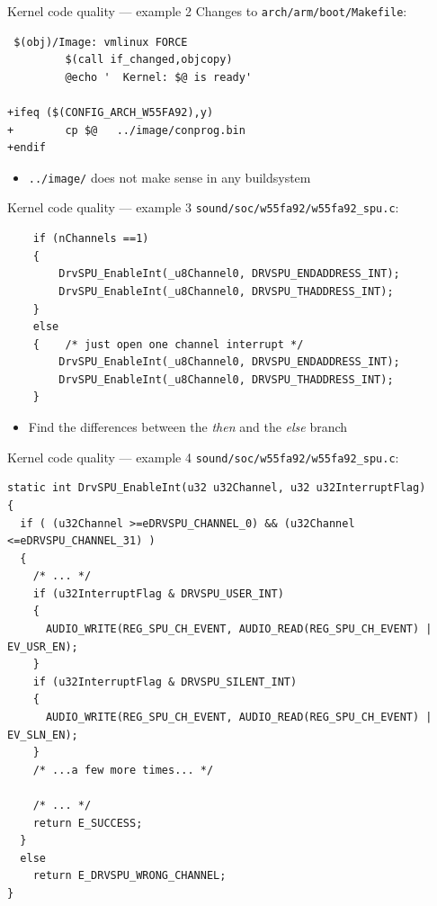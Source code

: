 \documentclass[xetex,table,aspectratio=169]{beamer}
\begin{document}
\begin{frame}[fragile]{Kernel code quality --- example 2}
  Changes to \texttt{arch/arm/boot/Makefile}:

  \begin{verbatim}
 $(obj)/Image: vmlinux FORCE
         $(call if_changed,objcopy)
         @echo '  Kernel: $@ is ready'

+ifeq ($(CONFIG_ARCH_W55FA92),y)
+        cp $@   ../image/conprog.bin
+endif
  \end{verbatim}

  \begin{itemize}
  \item \texttt{../image/} does not make sense in any buildsystem
  \end{itemize}
\end{frame}

\begin{frame}[fragile]{Kernel code quality --- example 3}
  \texttt{sound/soc/w55fa92/w55fa92\_spu.c}:

  \begin{verbatim}
    if (nChannels ==1)
    {
        DrvSPU_EnableInt(_u8Channel0, DRVSPU_ENDADDRESS_INT);
        DrvSPU_EnableInt(_u8Channel0, DRVSPU_THADDRESS_INT);
    }
    else
    {    /* just open one channel interrupt */
        DrvSPU_EnableInt(_u8Channel0, DRVSPU_ENDADDRESS_INT);
        DrvSPU_EnableInt(_u8Channel0, DRVSPU_THADDRESS_INT);
    }
  \end{verbatim}

  \begin{itemize}
  \item Find the differences between the {\em then} and the {\em else} branch
  \end{itemize}
\end{frame}

\begin{frame}[fragile]{Kernel code quality --- example 4}
  \texttt{sound/soc/w55fa92/w55fa92\_spu.c}:

  \linespread{0.5}
  \begin{verbatim}
static int DrvSPU_EnableInt(u32 u32Channel, u32 u32InterruptFlag)
{
  if ( (u32Channel >=eDRVSPU_CHANNEL_0) && (u32Channel <=eDRVSPU_CHANNEL_31) )
  {
    /* ... */
    if (u32InterruptFlag & DRVSPU_USER_INT)
    {
      AUDIO_WRITE(REG_SPU_CH_EVENT, AUDIO_READ(REG_SPU_CH_EVENT) | EV_USR_EN);
    }
    if (u32InterruptFlag & DRVSPU_SILENT_INT)
    {
      AUDIO_WRITE(REG_SPU_CH_EVENT, AUDIO_READ(REG_SPU_CH_EVENT) | EV_SLN_EN);
    }
    /* ...a few more times... */

    /* ... */
    return E_SUCCESS;
  }
  else
    return E_DRVSPU_WRONG_CHANNEL;
}
  \end{verbatim}
\end{frame}
\end{document}
